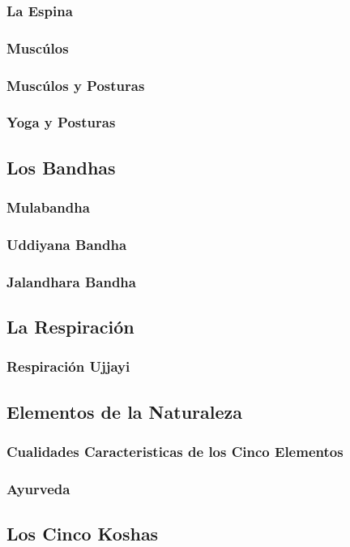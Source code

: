 \documentclass[a4paper]{article}
\begin{document}
\subsubsection{La Espina}
\subsubsection{Muscúlos}
\subsubsection{Muscúlos y Posturas}
\subsubsection{Yoga y Posturas}
\subsection{Los Bandhas}
\subsubsection{Mulabandha}
\subsubsection{Uddiyana Bandha}
\subsubsection{Jalandhara Bandha}
\subsection{La Respiración}
\subsubsection{Respiración Ujjayi}
\subsection{Elementos de la Naturaleza}
\subsubsection{Cualidades Caracteristicas de los Cinco Elementos}
\subsubsection{Ayurveda}
\subsection{Los Cinco Koshas}
\end{document}
